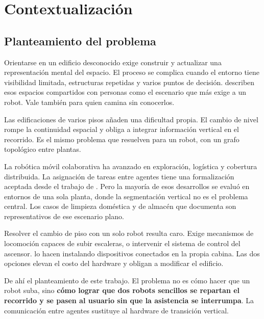 \chapter{Contextualización}

\section{Planteamiento del problema}

Orientarse en un edificio desconocido exige construir y actualizar una
representación mental del espacio. El proceso se complica cuando el entorno tiene
visibilidad limitada, estructuras repetidas y varios puntos de decisión.
\textcite{omer2025multilayer} describen esos espacios compartidos con personas
como el escenario que más exige a un robot. Vale también para quien camina sin
conocerlos.

Las edificaciones de varios pisos añaden una dificultad propia. El cambio de
nivel rompe la continuidad espacial y obliga a integrar información vertical en
el recorrido. Es el mismo problema que \textcite{kim2024indoor} resuelven para un
robot, con un grafo topológico entre plantas.

La robótica móvil colaborativa ha avanzado en exploración, logística y cobertura
distribuida. La asignación de tareas entre agentes tiene una formalización
aceptada desde el trabajo de \textcite{gerkey2004taxonomy}. Pero la mayoría de
esos desarrollos se evaluó en entornos de una sola planta, donde la segmentación
vertical no es el problema central. Los casos de limpieza doméstica y de almacén
que documenta \textcite{nair2024collaborative} son representativos de ese
escenario plano.

Resolver el cambio de piso con un solo robot resulta caro. Exige mecanismos de
locomoción capaces de subir escaleras, o intervenir el sistema de control del
ascensor. \textcite{song2024elevator} lo hacen instalando dispositivos conectados
en la propia cabina. Las dos opciones elevan el costo del hardware y
obligan a modificar el edificio.

De ahí el planteamiento de este trabajo. El problema no es cómo hacer que un
robot suba, sino \textbf{cómo lograr que dos robots sencillos se repartan el
recorrido y se pasen al usuario sin que la asistencia se interrumpa}. La
comunicación entre agentes sustituye al hardware de transición vertical.

